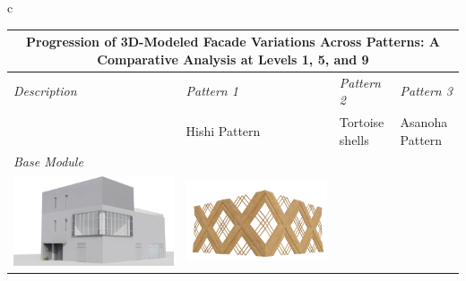 \documentclass[final,5p,times]{elsarticle}%
\begin{document}
\begin{linenumbers}
\begin{table}[!htb]
\begin{tabular}{c}
\begin{minipage}{\textwidth}
            \label{tab:PatternsVariationsPart0}
            \begin{tabularx}
            {\textwidth}{p{3cm} >{\centering\arraybackslash}X >{\centering\arraybackslash}X >{\centering\arraybackslash}X }
        \toprule
        \multicolumn{4}{c}{\textbf{Progression of 3D-Modeled Facade Variations Across Patterns: A Comparative Analysis at Levels 1, 5, and 9}}\\
        \toprule
        \textit{Description} &
          \textit{Pattern 1} &
          \textit{Pattern 2} &
          \textit{Pattern 3} \\
        \midrule
        \text{Pattern Name} & Hishi Pattern & Tortoise shells & Asanoha Pattern\\

        \midrule
        \textit{Base Module} &  &  &
        \\
        {\includegraphics[width=1\linewidth]{Images/Base Module/Building}} &
          {\includegraphics[width=1\linewidth]{Images/Base Module/Pattern1}} &

\end{tabularx}
\end{minipage}
\end{tabular}
\end{table}
\end{linenumbers}
\end{document}
